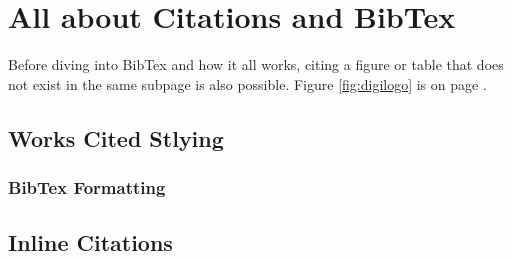\documentclass[./dissertation.tex]{subfiles}
\begin{document}
    \chapter{All about Citations and BibTex}
    Before diving into BibTex and how it all works, citing a figure or table that does not exist in the same subpage is also possible. Figure \ref{fig:digilogo} is on page \pageref{fig:digilogo}.
    \section{Works Cited Stlying}
      \subsection{BibTex Formatting}
        \parencite[9]{article1}
    \section{Inline Citations}
\end{document}
